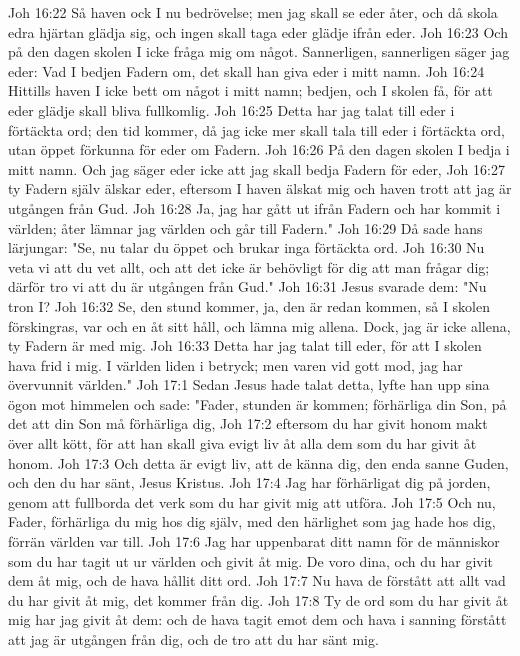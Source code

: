 Joh 16:22  Så haven ock I nu bedrövelse; men jag skall se eder åter, och då skola edra hjärtan glädja sig, och ingen skall taga eder glädje ifrån eder.
Joh 16:23  Och på den dagen skolen I icke fråga mig om något. Sannerligen, sannerligen säger jag eder: Vad I bedjen Fadern om, det skall han giva eder i mitt namn.
Joh 16:24  Hittills haven I icke bett om något i mitt namn; bedjen, och I skolen få, för att eder glädje skall bliva fullkomlig.
Joh 16:25  Detta har jag talat till eder i förtäckta ord; den tid kommer, då jag icke mer skall tala till eder i förtäckta ord, utan öppet förkunna för eder om Fadern.
Joh 16:26  På den dagen skolen I bedja i mitt namn. Och jag säger eder icke att jag skall bedja Fadern för eder,
Joh 16:27  ty Fadern själv älskar eder, eftersom I haven älskat mig och haven trott att jag är utgången från Gud.
Joh 16:28  Ja, jag har gått ut ifrån Fadern och har kommit i världen; åter lämnar jag världen och går till Fadern."
Joh 16:29  Då sade hans lärjungar: "Se, nu talar du öppet och brukar inga förtäckta ord.
Joh 16:30  Nu veta vi att du vet allt, och att det icke är behövligt för dig att man frågar dig; därför tro vi att du är utgången från Gud."
Joh 16:31  Jesus svarade dem: "Nu tron I?
Joh 16:32  Se, den stund kommer, ja, den är redan kommen, så I skolen förskingras, var och en åt sitt håll, och lämna mig allena. Dock, jag är icke allena, ty Fadern är med mig.
Joh 16:33  Detta har jag talat till eder, för att I skolen hava frid i mig. I världen liden i betryck; men varen vid gott mod, jag har övervunnit världen."
Joh 17:1  Sedan Jesus hade talat detta, lyfte han upp sina ögon mot himmelen och sade: "Fader, stunden är kommen; förhärliga din Son, på det att din Son må förhärliga dig,
Joh 17:2  eftersom du har givit honom makt över allt kött, för att han skall giva evigt liv åt alla dem som du har givit åt honom.
Joh 17:3  Och detta är evigt liv, att de känna dig, den enda sanne Guden, och den du har sänt, Jesus Kristus.
Joh 17:4  Jag har förhärligat dig på jorden, genom att fullborda det verk som du har givit mig att utföra.
Joh 17:5  Och nu, Fader, förhärliga du mig hos dig själv, med den härlighet som jag hade hos dig, förrän världen var till.
Joh 17:6  Jag har uppenbarat ditt namn för de människor som du har tagit ut ur världen och givit åt mig. De voro dina, och du har givit dem åt mig, och de hava hållit ditt ord.
Joh 17:7  Nu hava de förstått att allt vad du har givit åt mig, det kommer från dig.
Joh 17:8  Ty de ord som du har givit åt mig har jag givit åt dem: och de hava tagit emot dem och hava i sanning förstått att jag är utgången från dig, och de tro att du har sänt mig.
